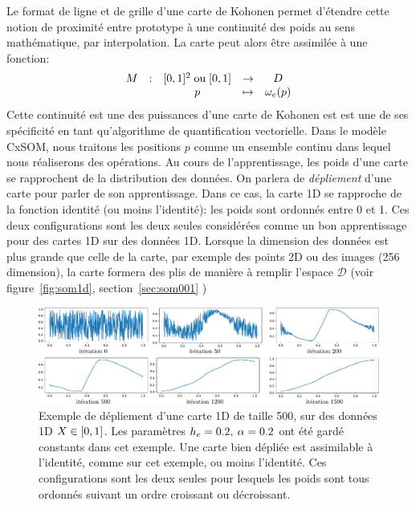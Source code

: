Le format de ligne et de grille d'une carte de Kohonen permet d'étendre cette notion de proximité entre prototype à une continuité des poids au sens mathématique, par interpolation. La carte peut alors être assimilée à une fonction:
\begin{equation*}
\begin{array}{ccccc}
M& : & [0,1]^2 \; \text{ou} \;[0,1] & \to & D \\
 & & p & \mapsto & \omega_e(p) \\
\end{array}
\end{equation*}
Cette continuité est une des puissances d'une carte de Kohonen est est une de ses spécificité en tant qu'algorithme de quantification vectorielle. Dans le modèle CxSOM, nous traitons les positions $p$ comme un ensemble continu dans lequel nous réaliserons des opérations.
Au cours de l'apprentissage, les poids d'une carte se rapprochent de la distribution des données.
On parlera de \emph{dépliement} d'une carte pour parler de son apprentissage. 
Dans ce cas, la carte 1D se rapproche de la fonction identité (ou moins l'identité): les poids sont ordonnés entre 0 et 1.
Ces deux configurations sont les deux seules considérées comme un bon apprentissage pour des cartes 1D sur des données 1D. Lorsque la dimension des données est plus grande que celle de la carte, par exemple des points 2D ou des images (256 dimension), la carte formera des plis de manière à remplir l'espace $\mathcal{D}$ (voir figure~\ref{fig:som1d}, section~\ref{sec:som001} ) 

\begin{figure}
\centering
\includegraphics[width=\textwidth]{depliement_1D.pdf}
\caption{Exemple de dépliement d'une carte 1D de taille 500, sur des données 1D $X \in [0,1]$. Les paramètres $h_{e} = 0.2, \: \alpha = 0.2$ ont été gardé constants dans cet exemple. Une carte bien dépliée est assimilable à l'identité, comme sur cet exemple, ou moins l'identité. Ces configurations sont les deux seules pour lesquels les poids sont tous ordonnés suivant un ordre croissant ou décroissant.}
\label{fig:depliement}
\end{figure}


